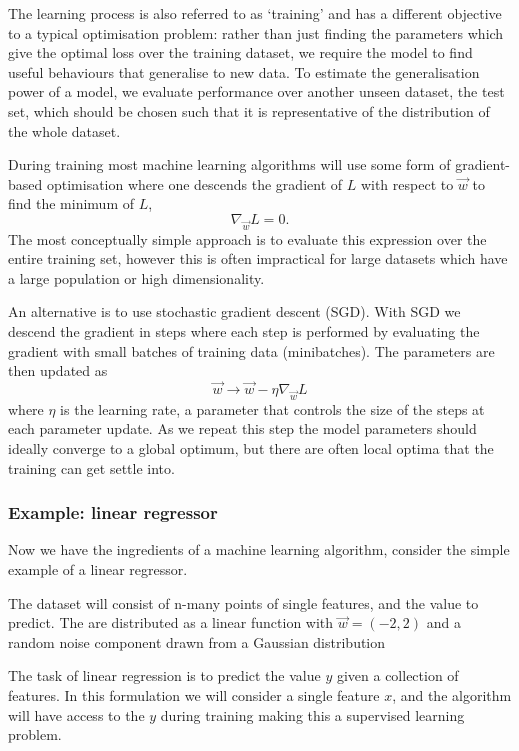 The learning process is also referred to as `training' and has a different objective to a typical optimisation problem: rather than just finding the parameters which give the optimal loss over the training dataset, we require the model to find useful behaviours that generalise to new data. 
To estimate the generalisation power of a model, we evaluate performance over another unseen dataset, the test set, which should be chosen such that it is representative of the distribution of the whole dataset.


During training most machine learning algorithms will use some form of gradient-based optimisation where one descends the gradient of $L$ with respect to $\vec{w}$ to find the minimum of $L$,
\begin{equation}
    \nabla_{\vec{w}}L = 0.
\end{equation}
The most conceptually simple approach is to evaluate this expression over the entire training set, however this is often impractical for large datasets which have a large population or high dimensionality. 

An alternative is to use stochastic gradient descent (SGD). With SGD we descend the gradient in steps where each step is performed by evaluating the gradient with small batches of training data (minibatches). 
The parameters are then updated as
\begin{equation}
    \vec{w} \rightarrow \vec{w} - \eta\nabla_{\vec{w}}L
\end{equation}
where $\eta$ is the learning rate, a parameter that controls the size of the steps at each parameter update. As we repeat this step the model parameters should ideally converge to a global optimum, but there are often local optima that the training can get settle into. 


\subsubsection{Example: linear regressor}
Now we have the ingredients of a machine learning algorithm, consider the simple example of a linear regressor. 

The dataset will consist of n-many points of single features, and the value to predict. The are distributed as a linear function with $\vec{w} = (-2,2)$ and a random noise component drawn from a Gaussian distribution

The task of linear regression is to predict the value $y$ given a collection of features. In this formulation we will consider a single feature $x$, and the algorithm will have access to the $y$ during training making this a supervised learning problem. 

